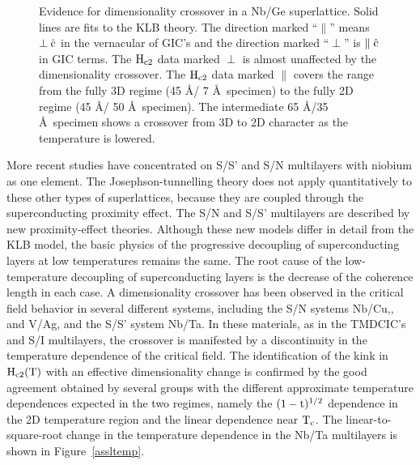\begin{figure}
\vspace{12cm}
\caption[Evidence for dimensionality crossover in a Nb/Ge
superlattice]{Evidence   for  dimensionality    crossover  in    a    Nb/Ge
superlattice.\cite{ruggiero82}  Solid  lines    are    fits  to   the   KLB
theory.\cite{klemm75} The direction marked ``$\parallel$''   means  $\rm \perp
\hat{c}$ in the vernacular of GIC's and  the direction marked ``$\perp$''
is $\rm  \parallel \hat{c}$ in   GIC  terms.  The $\rm H_{c2}$  data marked
$\perp$ is almost  unaffected  by the  dimensionality crossover.   The $\rm
H_{c2}$ data marked $\parallel$ covers the range from the fully 3D regime
(45 \AA/ 7 \AA\ specimen) to the fully 2D regime (45 \AA/ 50
\AA\ specimen).  The intermediate 65 \AA/35 \AA\ specimen shows a crossover from 3D to
2D character as the temperature is lowered.}
\label{nbgetemp}
\end{figure}


        More recent studies have concentrated  on  S/S' and S/N multilayers
with niobium as one element.  The  Josephson-tunnelling theory does
not  apply quantitatively  to these other  types of superlattices,  because
they are coupled through the superconducting proximity effect.  The S/N and
S/S'       multilayers    are   described      by   new    proximity-effect
theories.\cite{biagi85,takahashi86b}  Although these new  models  differ in
detail from the KLB model, the basic physics  of the progressive decoupling
of superconducting layers at low  temperatures remains the  same.  The root
cause  of the low-temperature decoupling of  superconducting layers is 
the  decrease of the  coherence   length in  each case.    A dimensionality
crossover has been observed   in  the critical  field  behavior  in several
different  systems,  including the   S/N systems  Nb/Cu,\cite{chun84},  and
V/Ag,\cite{kanoda86} and the S/S' system Nb/Ta.\cite{broussard87}  In these
materials,  as  in  the  TMDCIC's and  S/I  multilayers, the   crossover is
manifested by a discontinuity in the temperature dependence of the critical
field.  The identification of the kink in $\rm H_{c2}(T)$ with an effective
dimensionality change  is  confirmed by the    good  agreement  obtained by
several groups\cite{chun84,broussard87}  with    the  different approximate
temperature  dependences  expected in  the   two  regimes, namely the  $\rm
(1-t)^{1/2}$  dependence   in  the 2D temperature  region   and  the linear
dependence  near   $\rm  T_c$.  The  linear-to-square-root  change  in  the
temperature    dependence   in     the  Nb/Ta  multilayers  is    shown  in
Figure~\ref{assltemp}.

